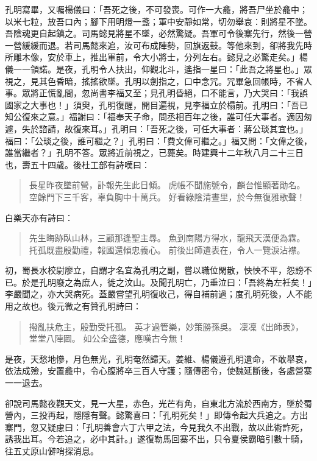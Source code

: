 孔明寫畢，又囑楊儀曰：「吾死之後，不可發喪。可作一大龕，將吾尸坐於龕中；以米七粒，放吾口內；腳下用明燈一盞；軍中安靜如常，切勿舉哀：則將星不墜。吾陰魂更自起鎮之。司馬懿見將星不墜，必然驚疑。吾軍可令後寨先行，然後一營一營緩緩而退。若司馬懿來追，汝可布成陣勢，回旗返鼓。等他來到，卻將我先時所雕木像，安於車上，推出軍前，令大小將士，分列左右。懿見之必驚走矣。」楊儀一一領諾。是夜，孔明令人扶出，仰觀北斗，遙指一星曰：「此吾之將星也。」眾視之，見其色昏暗，搖搖欲墜。孔明以劍指之，口中念咒。咒畢急回帳時，不省人事。眾將正慌亂間，忽尚書李福又至；見孔明昏絕，口不能言，乃大哭曰：「我誤國家之大事也！」須臾，孔明復醒，開目遍視，見李福立於榻前。孔明曰：「吾已知公復來之意。」福謝曰：「福奉天子命，問丞相百年之後，誰可任大事者。適因匆遽，失於諮請，故復來耳。」孔明曰：「吾死之後，可任大事者：蔣公琰其宜也。」福曰：「公琰之後，誰可繼之？」孔明曰：「費文偉可繼之。」福又問：「文偉之後，誰當繼者？」孔明不答。眾將近前視之，已薨矣。時建興十二年秋八月二十三日也，壽五十四歲。後杜工部有詩嘆曰：

\begin{quote}
長星昨夜墜前營，訃報先生此日傾。
虎帳不聞施號令，麟台惟顯著勛名。
空餘門下三千客，辜負胸中十萬兵。
好看綠陰清晝里，於今無復雅歌聲！
\end{quote}

白樂天亦有詩曰：

\begin{quote}
先生晦跡臥山林，三顧那逢聖主尋。
魚到南陽方得水，龍飛天漢便為霖。
托孤既盡殷勤禮，報國還傾忠義心。
前後出師遺表在，令人一覽淚沾襟。
\end{quote}

初，蜀長水校尉廖立，自謂才名宜為孔明之副，嘗以職位閑散，怏怏不平，怨謗不已。於是孔明廢之為庶人，徙之汶山。及聞孔明亡，乃垂泣曰：「吾終為左衽矣！」李嚴聞之，亦大哭病死。蓋嚴嘗望孔明復收己，得自補前過；度孔明死後，人不能用之故也。後元微之有贊孔明詩曰：

\begin{quote}
撥亂扶危主，殷勤受托孤。
英才過管樂，妙策勝孫吳。
凜凜《出師表》，堂堂八陣圖。
如公全盛德，應嘆古今無！
\end{quote}

是夜，天愁地慘，月色無光，孔明奄然歸天。姜維、楊儀遵孔明遺命，不敢舉哀，依法成殮，安置龕中，令心腹將卒三百人守護；隨傳密令，使魏延斷後，各處營寨一一退去。

卻說司馬懿夜觀天文，見一大星，赤色，光芒有角，自東北方流於西南方，墜於蜀營內，三投再起，隱隱有聲。懿驚喜曰：「孔明死矣！」即傳令起大兵追之。方出寨門，忽又疑慮曰：「孔明善會六丁六甲之法，今見我久不出戰，故以此術詐死，誘我出耳。今若追之，必中其計。」遂復勒馬回寨不出，只令夏侯霸暗引數十騎，往五丈原山僻哨探消息。

